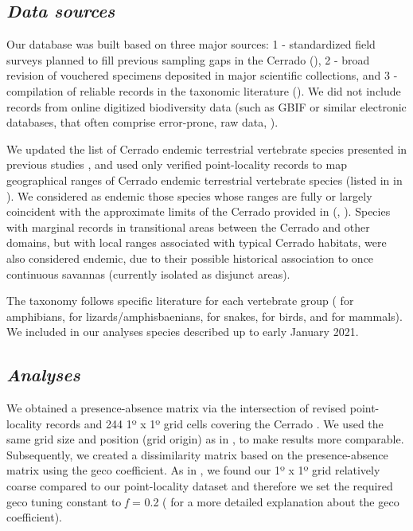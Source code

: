 \documentclass[12pt,openright,oneside,a4paper,english]{abntex2}
\begin{document}
\subsection{\textit{Data sources}}

Our database was built based on three major sources: 1 - standardized field surveys planned to fill previous sampling gaps in the Cerrado (\citealp[see][]{Nogueira2009, Valdujo2012, Carmignotto2022}), 2 - broad revision of vouchered specimens deposited in major scientific collections, and 3 - compilation of reliable records in the taxonomic literature (\citealp[details in][]{Nogueira2009, Valdujo2012, Nogueira2019, Carmignotto2022}). We did not include records from online digitized biodiversity data (such as GBIF or similar electronic databases, that often comprise error-prone, raw data, \citealp[see][and references therein]{Nogueira2019}).

We updated the list of Cerrado endemic terrestrial vertebrate species presented in previous studies \citep{Silva1997, Nogueira2011, Carmignotto2012, Azevedo2016, GutierrezMarinho2017}, and used only verified point-locality records to map geographical ranges of Cerrado endemic terrestrial vertebrate species (listed in  in ). We considered as endemic those species whose ranges are fully or largely coincident with the approximate limits of the Cerrado provided in \citeauthor{Dinerstein2017} (\citeyear{Dinerstein2017}, \citealp[see also][]{IBGE1993, Olson2001}). Species with marginal records in transitional areas between the Cerrado and other domains, but with local ranges associated with typical Cerrado habitats, were also considered endemic, due to their possible historical association to once continuous savannas (currently isolated as disjunct areas).

The taxonomy follows specific literature for each vertebrate group (\citealp{Frost2020} for amphibians, \citealp{Uetz2020} for lizards/amphisbaenians, \citealp{Nogueira2019} for snakes, \citealp{Pacheco2021birds} for birds, and \citealp{Abreu2021} for mammals). We included in our analyses species described up to early January 2021.


\subsection{\textit{Analyses}}

We obtained a presence-absence matrix via the intersection of revised point-locality records and 244 1º x 1º grid cells covering the Cerrado \citep{Dinerstein2017}. We used the same grid size and position (grid origin) as in \citet{Azevedo2016}, to make results more comparable. Subsequently, we created a dissimilarity matrix based on the presence-absence matrix using the geco coefficient. As in \citet{Azevedo2016}, we found our 1º x 1º grid relatively coarse compared to our point-locality dataset and therefore we set the required geco tuning constant to \textit{f} = 0.2 (\citealp[see][]{Hennig2006} for a more detailed explanation about the geco coefficient).
\end{document}
